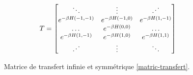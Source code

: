 \begin{figure}
    \begin{align}
    T = \begin{bmatrix} 
            \ddots & \vdots & \reflectbox{$\ddots$} \\ 
            e^{-\beta H(-1,-1)} &  e^{-\beta H(-1,0)} & e^{-\beta H(1,-1)} \\
            \dots & e^{-\beta H(0,0)} & \dots  \\
            e^{-\beta H(1,-1)} & e^{-\beta H(1,0)} & e^{-\beta H(1,1)}   \\ 
             \reflectbox{$\ddots$} & \vdots &\ddots  \\ 
        \end{bmatrix}
    \end{align}
    \caption{Matrice de transfert infinie et symmétrique \ref{matric-transfert}.}
    \label{mat-inf}
\end{figure}

